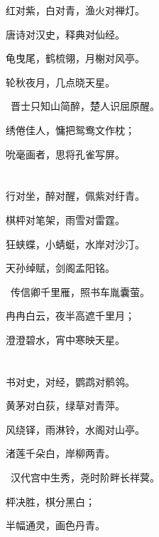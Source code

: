 \documentclass[12pt]{article}
\newcommand{\duiyun}{\CJKfamily{kai}\zihao{3}}}
\newcommand{\vs}{\vspace{14pt}}
\begin{document}
\begin{pinyinscope}
		红对紫，白对青，渔火对禅灯。
		
		唐诗对汉史，释典对仙经。\vs
		
		龟曳尾，鹤梳翎，月榭对风亭。
		
		轮秋夜月，几点晓天星。\vs
		
		\mbox{\hspace {-1.5em} 晋士只知山简醉，楚人识屈原醒。}
		
		\vs
		
		绣倦佳人，慵把鸳鸯文作枕；
		
		吮毫画者，思将孔雀写屏。
		
		\newpage
		
		\section*{}
		
		\duiyun
		
		行对坐，醉对醒，佩紫对纡青。
		
		棋枰对笔架，雨雪对雷霆。\vs
		
		狂蛱蝶，小蜻蜓，水岸对沙汀。
		
		天孙绰赋，剑阁孟阳铭。\vs
		
		\mbox{\hspace {-1.5em} 传信卿千里雁，照书车胤囊萤。}
		
		\vs
		
		冉冉白云，夜半高遮千里月；
		
		澄澄碧水，宵中寒映天星。
		
		\newpage
		
		\section*{}
		
		\duiyun
		
		书对史，对经，鹦鹉对鹡鸰。
		
		黄茅对白荻，绿草对青萍。\vs
		
		风绕铎，雨淋铃，水阁对山亭。
		
		渚莲千朵白，岸柳两青。\vs
		
		\mbox{\hspace {-1.5em} 汉代宫中生秀，尧时阶畔长祥蓂。}
		
		\vs
		
		枰决胜，棋分黑白；
		
		半幅通灵，画色丹青。
		

\end{pinyinscope}
\end{document}
